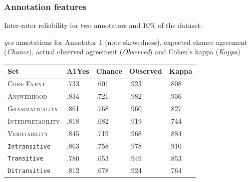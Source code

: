 \documentclass[handout,xcolor={dvipsnames}]{beamer}
\newcommand{\feat}[1]{\textsc{#1}}
\newcommand{\param}[1]{\texttt{#1}}
\begin{document}


\begin{frame}
\frametitle{Annotation features}

\normalsize
\pause
Inter-rater reliability for two annotators and 10\% of the dataset:
\pause

\textit{yes} annotations for Annotator 1 (note skewedness), expected chance agreement (\textit{Chance}), actual observed agreement (\textit{Observed}) and Cohen's kappa (\textit{Kappa})

\begin{table}[htb!]
\begin{center}
\begin{tabular}{|l|l||l|l||l|}
\hline
Set	& A1Yes & Chance & Observed & Kappa \\
\hline
\hline
\feat{Core Event} & .733 & .601 & .923 & .808 \\
\hline
\feat{Answerhood} & .834 & .721 & .982 & .936 \\
\hline
\feat{Grammaticality} & .861 & .768 & .960 & .827 \\
\hline
\feat{Interpretability} & .818 & .682 & .919 & .744 \\
\hline
\feat{Verifiability} & .845 & .719 & .968 & .884 \\
\hline
\hline
\param{Intransitive} & .863 & .758 & .978 & .910 \\
\hline
\param{Transitive} & .780 & .653 & .949 & .853 \\
\hline
\param{Ditransitive} & .812 & .678 & .924 & .764 \\ 
\hline
\end{tabular}
\end{center}
\end{table}
\end{frame}

\end{document}
